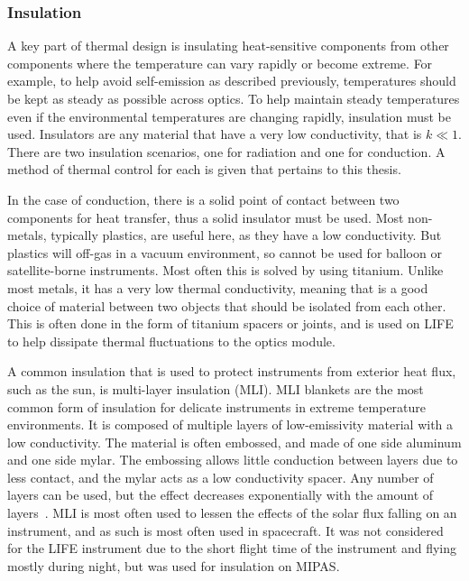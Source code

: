 \subsubsection{Insulation}

A key part of thermal design is insulating heat-sensitive components from other components where the temperature can vary rapidly or become extreme. For example, to help avoid self-emission as described previously, temperatures should be kept as steady as possible across optics. To help maintain steady temperatures even if the environmental temperatures are changing rapidly, insulation must be used. Insulators are any material that have a very low conductivity, that is $k \ll 1$. There are two insulation scenarios, one for radiation and one for conduction. A method of thermal control for each is given that pertains to this thesis.

In the case of conduction, there is a solid point of contact between two components for heat transfer, thus a solid insulator must be used. Most non-metals, typically plastics, are useful here, as they have a low conductivity. But plastics will off-gas in a vacuum environment, so cannot be used for balloon or satellite-borne instruments. Most often this is solved by using titanium. Unlike most metals, it has a very low thermal conductivity, meaning that is a good choice of material between two objects that should be isolated from each other. This is often done in the form of titanium spacers or joints, and is used on LIFE to help dissipate thermal fluctuations to the optics module.

A common insulation that is used to protect instruments from exterior heat flux, such as the sun, is multi-layer insulation (MLI). MLI blankets are the most common form of insulation for delicate instruments in extreme temperature environments. It is composed of multiple layers of low-emissivity material with a low conductivity. The material is often embossed, and made of one side aluminum and one side mylar. The embossing allows little conduction between layers due to less contact, and the mylar acts as a low conductivity spacer. Any number of layers can be used, but the effect decreases exponentially with the amount of layers~\citep{SMAD}. MLI is most often used to lessen the effects of the solar flux falling on an instrument, and as such is most often used in spacecraft. It was not considered for the LIFE instrument due to the short flight time of the instrument and flying mostly during night, but was used for insulation on MIPAS.

